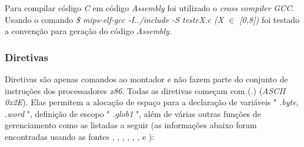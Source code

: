 \documentclass[12pt]{article}
\begin{document}
Para compilar código \textit{C} em código \textit{Assembly} foi utilizado o \textit{cross compiler} \cite{MIPS} \textit{GCC}. Usando o comando \textit{\$ mips-elf-gcc -I../include -S testeX.c (X $\in$ [0,8])} foi testado a convenção para geração do código \textit{Assembly}.

\subsubsection{Diretivas}
\label{subsubsec:diretivas}

Diretivas são apenas comandos ao montador e não fazem parte do conjunto de instruções dos processadores \textit{x86}. Todas as diretivas começam com (.) (\textit{ASCII 0x2E}). Elas permitem a alocação de espaço para a declaração de variáveis " \textit{.byte}, \textit{.word} ", definição de escopo " \textit{.glob1} ", além de várias outras funções de gerenciamento como as listadas a seguir (as informações abaixo foram encontradas usando as fontes \cite{mips1}, \cite{mips2-1}, \cite{mips2-2}, \cite{mips2-3}, \cite{mips3},
\cite{mips4}, \cite{mips5} e \cite{mips6} ):
\end{document}
